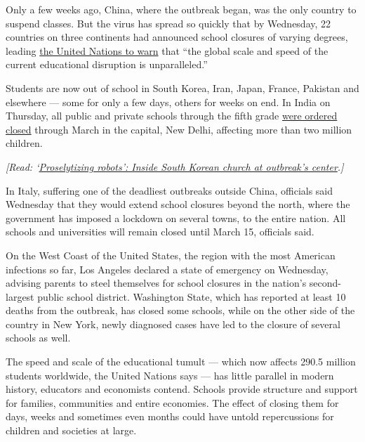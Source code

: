 Only a few weeks ago, China, where the outbreak began, was the only
country to suspend classes. But the virus has spread so quickly that by
Wednesday, 22 countries on three continents had announced school
closures of varying degrees, leading
\href{https://en.unesco.org/news/290-million-students-out-school-due-covid-19-unesco-releases-first-global-numbers-and-mobilizes}{the
United Nations to warn} that ``the global scale and speed of the current
educational disruption is unparalleled.''

Students are now out of school in South Korea, Iran, Japan, France,
Pakistan and elsewhere --- some for only a few days, others for weeks on
end. In India on Thursday, all public and private schools through the
fifth grade
\href{https://www.nytimes3xbfgragh.onion/2020/03/05/world/coronavirus-news.html?action=click\&module=Top\%20Stories\&pgtype=Homepage\#link-4c11ca8b}{were
ordered closed} through March in the capital, New Delhi, affecting more
than two million children.

\emph{{[}Read:
`}\href{https://www.nytimes3xbfgragh.onion/2020/03/10/world/asia/south-korea-coronavirus-shincheonji.html}{\emph{Proselytizing
robots': Inside South Korean church at outbreak's center}}\emph{.{]}}

In Italy, suffering one of the deadliest outbreaks outside China,
officials said Wednesday that they would extend school closures beyond
the north, where the government has imposed a lockdown on several towns,
to the entire nation. All schools and universities will remain closed
until March 15, officials said.

On the West Coast of the United States, the region with the most
American infections so far, Los Angeles declared a state of emergency on
Wednesday, advising parents to steel themselves for school closures in
the nation's second-largest public school district. Washington State,
which has reported at least 10 deaths from the outbreak, has closed some
schools, while on the other side of the country in New York, newly
diagnosed cases have led to the closure of several schools as well.

The speed and scale of the educational tumult --- which now affects
290.5 million students worldwide, the United Nations says --- has little
parallel in modern history, educators and economists contend. Schools
provide structure and support for families, communities and entire
economies. The effect of closing them for days, weeks and sometimes even
months could have untold repercussions for children and societies at
large.

